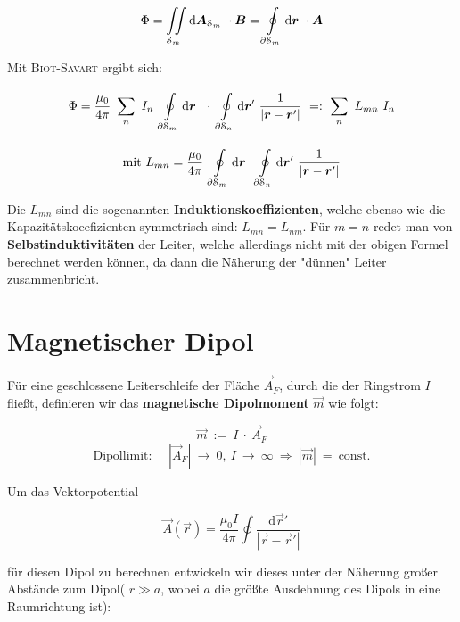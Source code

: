 \begin{equation*}
\Phi = \iint\limits_{{\mathcal{S}_m}}^{{}}\mathrm{d}{\bm{A}_{\mathcal{S}_m}}\ \cdot\bm{B} = \oint\limits_{{\partial\mathcal{S}_m}}^{{}}\mathrm{d}{\bm{r}}\ \cdot\bm{A}
\end{equation*}

Mit \textsc{Biot-Savart} ergibt sich:

\begin{equation*}
\Phi = \frac{\mu_0}{4\pi}\ \sum_n \ I_n \ \Oint{\partial\mathcal{S}_m}{}{\vec{r}}\ \cdot \ \Oint{\partial\mathcal{S}_n}{}{\vec{r}'}\frac{1}{|\vec{r}-\vec{r}'|} \ =: \ \sum_n \ L_{mn} \ I_n
\end{equation*}

\begin{equation*}
\text{mit } L_{mn} = \frac{\mu_0}{4\pi} \ \Oint{\partial\mathcal{S}_m}{}{\vec{r}}\ \Oint{\partial\mathcal{S}_n}{}{\vec{r}'}\frac{1}{|\vec{r}-\vec{r}'|}
\end{equation*}

Die $L_{mn}$ sind die sogenannten \textbf{Induktionskoeffizienten}, welche ebenso wie die Kapazitätskoeefizienten symmetrisch sind: $L_{mn} = L_{nm}$. Für $m=n$ redet man von \textbf{Selbstinduktivitäten} der Leiter, welche allerdings  nicht mit der obigen Formel berechnet werden können, da dann die Näherung der "dünnen" Leiter zusammenbricht.

\section{Magnetischer Dipol}

Für eine geschlossene Leiterschleife der Fläche $\vec{A}_F$, durch die der Ringstrom $I$ fließt, definieren wir das \textbf{magnetische Dipolmoment} $\vec{m}$ wie folgt:

\begin{equation*}
\vec{m} \ := \ I \ \cdot \ \vec{A}_F
\end{equation*}
\begin{equation*}
\text{Dipollimit: } \quad |\vec{A}_F| \ \rightarrow \ 0, \ I \ \rightarrow \ \infty \ \Rightarrow \ |\vec{m}| \ = \ \text{const.}
\end{equation*}

Um das Vektorpotential

\begin{equation*}
\vec{A}(\vec{r}) = \frac{\mu_0 I}{4\pi}\oint\frac{\mathrm{d}\vec{r}'}{|\vec{r}-\vec{r}'|}
\end{equation*}

für diesen Dipol zu berechnen entwickeln wir dieses unter der Näherung großer Abstände zum Dipol( $r\gg a$, wobei $a$ die größte Ausdehnung des Dipols in eine Raumrichtung ist):

